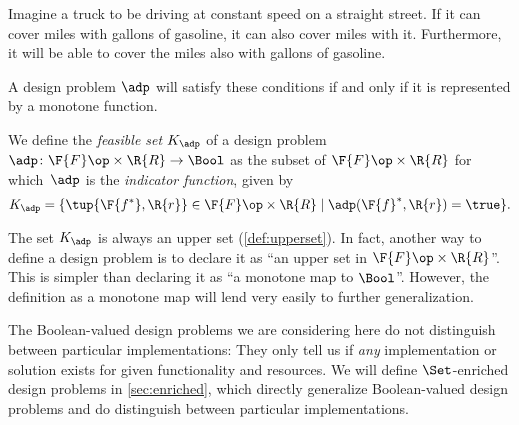 \begin{example}
Imagine a truck to be driving at constant speed on a straight street. If it can cover \unit[100]{miles} with \unit[5]{gallons} of gasoline, it can also cover \unit[80]{miles} with it. Furthermore, it will be able to cover the \unit[100]{miles} also with \unit[10]{gallons} of gasoline.
\end{example}

A design problem $\adp$ will satisfy these conditions if and only if it is represented by a monotone function. 
\begin{definition}
We define the \emph{feasible set} $K_\adp$ of a design problem $\adp\colon \F{F}\op \times \R{R}\to \Bool$ as the subset of $\F{F} \op\times \R{R}$ for which~$\adp$ is the \emph{indicator function}, given by
\begin{equation}
    K_\adp = \{ \tup{\F{f^*},\R{r}} \in \F{F} \op\times \R{R}  \mid
            \adp(\F{f}^*, \R{r}) = \true
                \}.
\end{equation}
\end{definition}
\begin{remark}
The set $K_\adp$ is always an upper set (\cref{def:upperset}). In fact, another way to define a design problem is to declare it as ``an upper
set in $\F{F}\op \times \R{R}$''. This is simpler than declaring it as ``a monotone map to $\Bool$''. However, the
definition as a monotone map will lend very easily to further generalization.
\end{remark}
The Boolean-valued design problems we are considering here do not distinguish between particular implementations: They only tell us if \emph{any} implementation or solution exists for given functionality and resources. We will define $\Set$-enriched design problems in \cref{sec:enriched}, which directly generalize Boolean-valued design problems and do distinguish between particular implementations.

